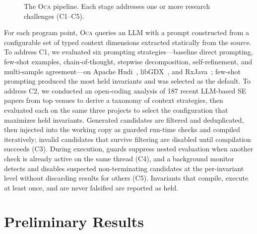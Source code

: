 \documentclass[sigplan,screen]{acmart}
\begin{document}
\begin{figure}[t]
\caption{The \textsc{Oca} pipeline. Each stage addresses one or more research challenges (C1--C5).}
\label{fig:pipeline}
\end{figure}

For each program point, \textsc{Oca} queries an LLM with a prompt constructed
from a configurable set of typed context dimensions extracted statically from the source.
To address C1, we evaluated six prompting strategies---baseline direct prompting,
few-shot examples, chain-of-thought, stepwise decomposition, self-refinement,
and multi-sample agreement---on Apache Hudi~\cite{hudi}, libGDX~\cite{libgdx}, and RxJava~\cite{rxjava};
few-shot prompting produced the most held invariants and was selected as the default.
To address C2, we conducted an open-coding analysis of 187 recent LLM-based SE papers
from top venues to derive a taxonomy of context strategies,
then evaluated each on the same three projects
to select the configuration that maximizes held invariants.
Generated candidates are filtered and deduplicated,
then injected into the working copy as guarded run-time checks
and compiled iteratively; invalid candidates that survive filtering
are disabled until compilation succeeds (C3).
During execution, guards suppress nested evaluation
when another check is already active on the same thread (C4),
and a background monitor detects and disables suspected non-terminating candidates
at the per-invariant level without discarding results for others (C5).
Invariants that compile, execute at least once, and are never falsified are reported as held.

\section{Preliminary Results}
\end{document}
